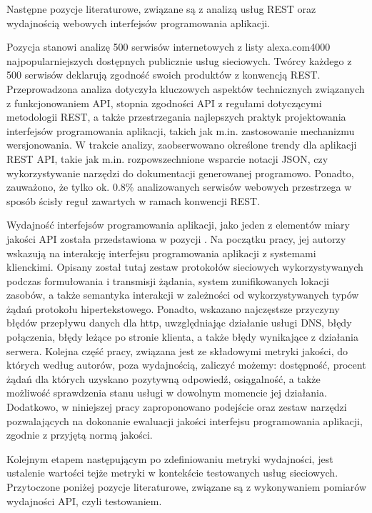 Następne pozycje literaturowe, związane są z analizą usług REST oraz wydajnością webowych interfejsów programowania aplikacji.

Pozycja \cite{neumann2018analysis} stanowi analizę 500 serwisów internetowych z listy alexa.com4000 najpopularniejszych dostępnych publicznie usług sieciowych. Twórcy każdego z 500 serwisów deklarują zgodność swoich produktów z konwencją REST. Przeprowadzona analiza dotyczyła kluczowych aspektów technicznych związanych z funkcjonowaniem API, stopnia zgodności API z regułami dotyczącymi metodologii REST, a także przestrzegania najlepszych praktyk projektowania interfejsów programowania aplikacji, takich jak m.in. zastosowanie mechanizmu wersjonowania. W trakcie analizy, zaobserwowano określone trendy dla aplikacji REST API, takie jak m.in. rozpowszechnione wsparcie notacji JSON, czy wykorzystywanie narzędzi do dokumentacji generowanej programowo. Ponadto, zauważono, że tylko ok. 0.8\% analizowanych serwisów webowych przestrzega w sposób ścisły reguł zawartych w ramach konwencji REST.

Wydajność interfejsów programowania aplikacji, jako jeden z elementów miary jakości API została przedstawiona w pozycji \cite{bermbach2016benchmarking}. Na początku pracy, jej autorzy wskazują na interakcję interfejsu programowania aplikacji z systemami klienckimi. Opisany został tutaj zestaw protokołów sieciowych wykorzystywanych podczas formułowania i transmisji żądania, system zunifikowanych lokacji zasobów, a także semantyka interakcji w zależności od wykorzystywanych typów żądań protokołu hipertekstowego. Ponadto, wskazano najczęstsze przyczyny błędów przepływu danych dla http, uwzględniając działanie usługi DNS, błędy połączenia, błędy leżące po stronie klienta, a także błędy wynikające z działania serwera. Kolejna część pracy, związana jest ze składowymi metryki jakości, do których według autorów, poza wydajnością, zaliczyć możemy: dostępność, procent żądań dla których uzyskano pozytywną odpowiedź, osiągalność, a także możliwość sprawdzenia stanu usługi w dowolnym momencie jej działania. Dodatkowo, w niniejszej pracy zaproponowano podejście oraz zestaw narzędzi pozwalających na dokonanie ewaluacji jakości interfejsu programowania aplikacji, zgodnie z przyjętą normą jakości.

Kolejnym etapem następującym po zdefiniowaniu metryki wydajności, jest ustalenie wartości tejże metryki w kontekście testowanych usług sieciowych. Przytoczone poniżej pozycje literaturowe, związane są z wykonywaniem pomiarów wydajności API, czyli testowaniem.

